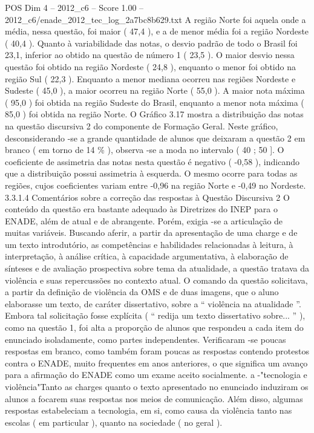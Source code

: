 \begin{textsample}{POS Dim 4 – 2012\_c6 – Score 1.00 – 2012\_c6/enade\_2012\_tec\_log\_2a7bc8b629.txt}
A região Norte foi aquela onde a média, nessa questão, foi maior ( 47,4 ), e a de menor média foi a região Nordeste ( 40,4 ).
Quanto à variabilidade das notas, o desvio padrão de todo o Brasil foi 23,1, inferior ao obtido na questão de número 1 ( 23,5 ).
O maior desvio nessa questão foi obtido na região Nordeste ( 24,8 ), enquanto o menor foi obtido na região Sul ( 22,3 ).
Enquanto a menor mediana ocorreu nas regiões Nordeste e Sudeste ( 45,0 ), a maior ocorreu na região Norte ( 55,0 ).
A maior nota máxima ( 95,0 ) foi obtida na região Sudeste do Brasil, enquanto a menor nota máxima ( 85,0 ) foi obtida na região Norte.
O Gráfico 3.17 mostra a distribuição das notas na questão discursiva 2 do componente de Formação Geral.
Neste gráfico, desconsiderando -se a grande quantidade de alunos que deixaram a questão 2 em branco ( em torno de 14 \% ), observa -se a moda no intervalo ( 40 ; 50 ].
O coeficiente de assimetria das notas nesta questão é negativo ( -0,58 ), indicando que a distribuição possui assimetria à esquerda.
O mesmo ocorre para todas as regiões, cujos coeficientes variam entre -0,96 na região Norte e -0,49 no Nordeste. 3.3.1.4 Comentários sobre a correção das respostas à Questão Discursiva 2 O conteúdo da questão era bastante adequado às Diretrizes do INEP para o ENADE, além de atual e de abrangente.
Porém, exigia -se a articulação de muitas variáveis.
Buscando aferir, a partir da apresentação de uma charge e de um texto introdutório, as competências e habilidades relacionadas à leitura, à interpretação, à análise crítica, à capacidade argumentativa, à elaboração de sínteses e de avaliação prospectiva sobre tema da atualidade, a questão tratava da violência e suas repercussões no contexto atual.
O comando da questão solicitava, a partir da definição de violência da OMS e de duas imagens, que o aluno elaborasse um texto, de caráter dissertativo, sobre a “ violência na atualidade ”.
Embora tal solicitação fosse explícita ( “ redija um texto dissertativo sobre... ” ), como na questão 1, foi alta a proporção de alunos que respondeu a cada item do enunciado isoladamente, como partes independentes.
Verificaram -se poucas respostas em branco, como também foram poucas as respostas contendo protestos contra o ENADE, muito frequentes em anos anteriores, o que significa um avanço para a afirmação do ENADE como um exame aceito socialmente. a -"tecnologia e violência"Tanto as charges quanto o texto apresentado no enunciado induziram os alunos a focarem suas respostas nos meios de comunicação.
Além disso, algumas respostas estabeleciam a tecnologia, em si, como causa da violência tanto nas escolas ( em particular ), quanto na sociedade ( no geral ).

\end{textsample}
